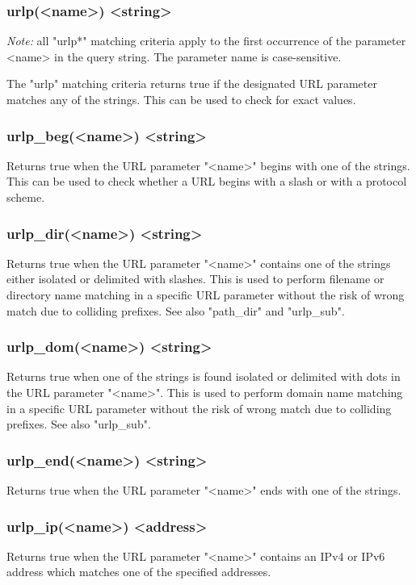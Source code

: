 \subsubsection[urlp]{urlp(<name>) <string>}
  \emph{Note:} all "urlp*" matching criteria apply to the first occurrence of the
  parameter <name> in the query string. The parameter name is case-sensitive.

  The "urlp" matching criteria returns true if the designated URL parameter
  matches any of the strings. This can be used to check for exact values.

\subsubsection[urlp\_beg]{urlp\_beg(<name>) <string>}
  Returns true when the URL parameter "<name>" begins with one of the strings.
  This can be used to check whether a URL begins with a slash or with a
  protocol scheme.

\subsubsection[urlp\_dir]{urlp\_dir(<name>) <string>}
  Returns true when the URL parameter "<name>" contains one of the strings
  either isolated or delimited with slashes. This is used to perform filename
  or directory name matching in a specific URL parameter without the risk of
  wrong match due to colliding prefixes. See also "path\_dir" and "urlp\_sub".

\subsubsection[urlp\_dom]{urlp\_dom(<name>) <string>}
  Returns true when one of the strings is found isolated or delimited with dots
  in the URL parameter "<name>". This is used to perform domain name matching
  in a specific URL parameter without the risk of wrong match due to colliding
  prefixes. See also "urlp\_sub".

\subsubsection[urlp\_end]{urlp\_end(<name>) <string>}
  Returns true when the URL parameter "<name>" ends with one of the strings.

\subsubsection[urlp\_ip]{urlp\_ip(<name>) <address>}
  Returns true when the URL parameter "<name>" contains an IPv4 or IPv6 address
  which matches one of the specified addresses.

